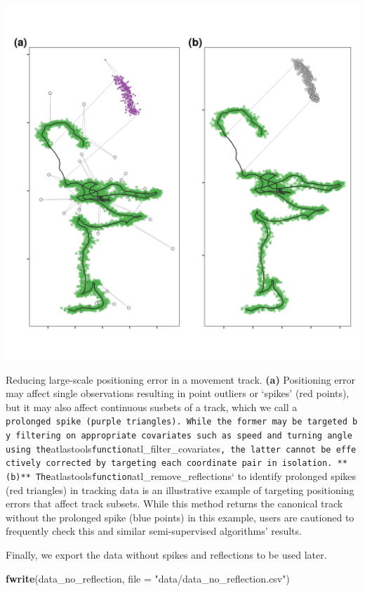 \documentclass[
]{scrreprt}
\newenvironment{Shaded}{}{}
\newcommand{\DataTypeTok}[1]{\textcolor[rgb]{0.56,0.13,0.00}{#1}}
\newcommand{\KeywordTok}[1]{\textcolor[rgb]{0.00,0.44,0.13}{\textbf{#1}}}
\newcommand{\NormalTok}[1]{#1}
\newcommand{\StringTok}[1]{\textcolor[rgb]{0.25,0.44,0.63}{#1}}
\begin{document}
\includegraphics{figures/fig_correct_tracks.png}

Reducing large-scale positioning error in a movement track. \textbf{(a)} Positioning error may affect single observations resulting in point outliers or `spikes' (red points), but it may also affect continuous susbets of a track, which we call a \texttt{prolonged\ spike\textquotesingle{}\ (purple\ triangles).\ While\ the\ former\ may\ be\ targeted\ by\ filtering\ on\ appropriate\ covariates\ such\ as\ speed\ and\ turning\ angle\ using\ the}atlastools\texttt{function}atl\_filter\_covariates\texttt{,\ the\ latter\ cannot\ be\ effectively\ corrected\ by\ targeting\ each\ coordinate\ pair\ in\ isolation.\ **(b)**\ The}atlastools\texttt{function}atl\_remove\_reflections` to identify prolonged spikes (red triangles) in tracking data is an illustrative example of targeting positioning errors that affect track subsets. While this method returns the canonical track without the prolonged spike (blue points) in this example, users are cautioned to frequently check this and similar semi-supervised algorithms' results.

Finally, we export the data without spikes and reflections to be used later.

\begin{Shaded}
\begin{Highlighting}[]
\KeywordTok{fwrite}\NormalTok{(data\_no\_reflection, }\DataTypeTok{file =} \StringTok{"data/data\_no\_reflection.csv"}\NormalTok{)}
\end{Highlighting}
\end{Shaded}
\end{document}
